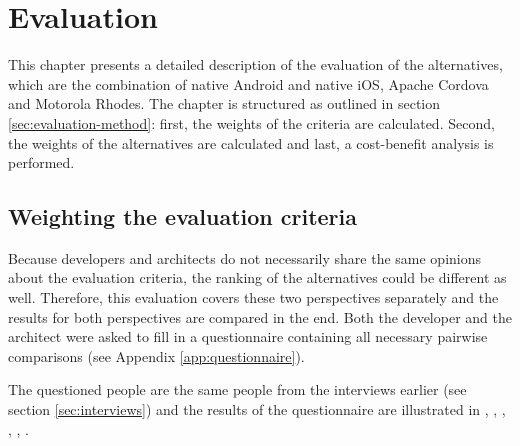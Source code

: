 \chapter{Evaluation}
\label{chap:evaluation}

This chapter presents a detailed description of the evaluation of the alternatives, which are the combination of native Android and native iOS, Apache Cordova and Motorola Rhodes. The chapter is structured as outlined in section \ref{sec:evaluation-method}: first, the weights of the criteria are calculated. Second, the weights of the alternatives are calculated and last, a cost-benefit analysis is performed.

\section{Weighting the evaluation criteria}

Because developers and architects do not necessarily share the same opinions about the evaluation criteria, the ranking of the alternatives could be different as well. Therefore, this evaluation covers these two perspectives separately and the results for both perspectives are compared in the end. Both the developer and the architect were asked to fill in a questionnaire containing all necessary pairwise comparisons (see Appendix \ref{app:questionnaire}). 

The questioned people are the same people from the interviews earlier (see section \ref{sec:interviews}) and the results of the questionnaire are illustrated in , , , , , .

